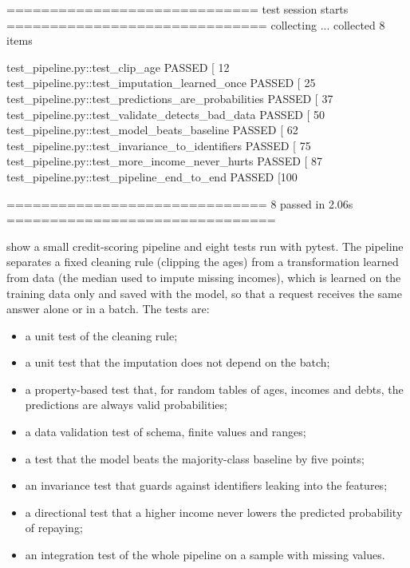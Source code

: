\begin{pyoutput}
============================= test session starts ==============================
collecting ... collected 8 items

test_pipeline.py::test_clip_age PASSED                                   [ 12%
test_pipeline.py::test_imputation_learned_once PASSED                    [ 25%
test_pipeline.py::test_predictions_are_probabilities PASSED              [ 37%
test_pipeline.py::test_validate_detects_bad_data PASSED                  [ 50%
test_pipeline.py::test_model_beats_baseline PASSED                       [ 62%
test_pipeline.py::test_invariance_to_identifiers PASSED                  [ 75%
test_pipeline.py::test_more_income_never_hurts PASSED                    [ 87%
test_pipeline.py::test_pipeline_end_to_end PASSED                        [100%

============================== 8 passed in 2.06s ===============================
\end{pyoutput}

 show a small credit-scoring pipeline and eight tests run with pytest. The
pipeline separates a fixed cleaning rule (clipping the ages) from a transformation learned from data (the
median used to impute missing incomes), which is learned on the training data only and saved with the
model, so that a request receives the same answer alone or in a batch. The tests are: \begin{itemize}
\item a unit test of the
cleaning rule; \item a unit test that the imputation does not depend on the batch; \item a property-based test that,
for random tables of ages, incomes and debts, the predictions are always valid probabilities; \item a data
validation test of schema, finite values and ranges; \item a test that the model beats the
majority-class baseline by five points; \item an invariance test that guards against identifiers leaking into
the features; \item a directional test that a higher income never lowers the predicted probability of
repaying; \item an integration test of the whole pipeline on a sample with missing values.
\end{itemize}

